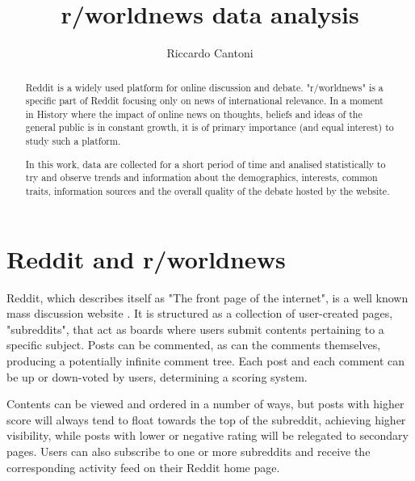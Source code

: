 \documentclass{article}
\begin{document}
\title{r/worldnews data analysis}

\author{Riccardo Cantoni}

\maketitle

\listoftodos

\tableofcontents

\begin{abstract}
Reddit is a widely used platform for online discussion and debate. "r/worldnews" is a specific part of Reddit focusing only on news of international relevance. In a moment in History where the impact of online news on thoughts, beliefs and ideas of the general public is in constant growth, it is of primary importance (and equal interest) to study such a platform.

In this work, data are collected for a short period of time and analised statistically to try and observe trends and information about the demographics, interests, common traits, information sources and the overall quality of the debate hosted by the website.
\end{abstract}

\section{Reddit and r/worldnews}
Reddit, which describes itself as "The front page of the internet", is a well known mass discussion website \cite{reddit}. It is structured as a collection of user-created pages, "subreddits", that act as boards where users submit contents pertaining to a specific subject. Posts can be commented, as can the comments themselves, producing a potentially infinite comment tree. Each post and each comment can be up or down-voted by users, determining a scoring system.

Contents can be viewed and ordered in a number of ways, but posts with higher score will always tend to float towards the top of the subreddit, achieving higher visibility, while posts with lower or negative rating will be relegated to secondary pages. Users can also subscribe to one or more subreddits and receive  the corresponding activity feed on their Reddit home page.
\end{document}
